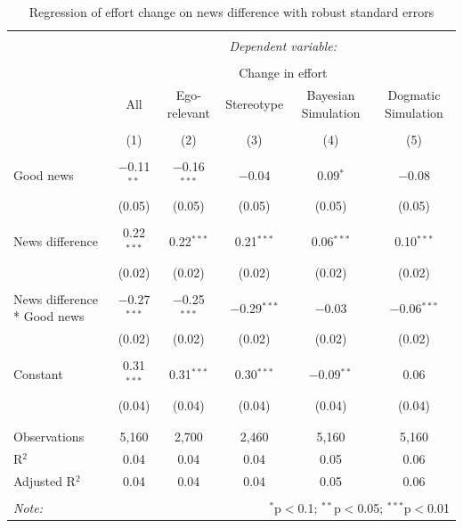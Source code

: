 \documentclass[
  12pt,
]{article}
\begin{document}
\begin{table} \centering 
  \caption{Regression of effort change on news difference with robust standard errors} 
  \label{tab:regression} 
\begin{tabular}{@{\extracolsep{5pt}}lccccc} 
\\[-1.8ex]\hline 
\hline \\[-1.8ex] 
 & \multicolumn{5}{c}{\textit{Dependent variable:}} \\ 
\cline{2-6} 
\\[-1.8ex] & \multicolumn{5}{c}{Change in effort} \\ 
 & All & Ego-relevant & Stereotype & Bayesian Simulation & Dogmatic Simulation \\ 
\\[-1.8ex] & (1) & (2) & (3) & (4) & (5)\\ 
\hline \\[-1.8ex] 
 Good news & $-$0.11$^{**}$ & $-$0.16$^{***}$ & $-$0.04 & 0.09$^{*}$ & $-$0.08 \\ 
  & (0.05) & (0.05) & (0.05) & (0.05) & (0.05) \\ 
  & & & & & \\ 
 News difference & 0.22$^{***}$ & 0.22$^{***}$ & 0.21$^{***}$ & 0.06$^{***}$ & 0.10$^{***}$ \\ 
  & (0.02) & (0.02) & (0.02) & (0.02) & (0.02) \\ 
  & & & & & \\ 
 News difference * Good news & $-$0.27$^{***}$ & $-$0.25$^{***}$ & $-$0.29$^{***}$ & $-$0.03 & $-$0.06$^{***}$ \\ 
  & (0.02) & (0.02) & (0.02) & (0.02) & (0.02) \\ 
  & & & & & \\ 
 Constant & 0.31$^{***}$ & 0.31$^{***}$ & 0.30$^{***}$ & $-$0.09$^{**}$ & 0.06 \\ 
  & (0.04) & (0.04) & (0.04) & (0.04) & (0.04) \\ 
  & & & & & \\ 
\hline \\[-1.8ex] 
Observations & 5,160 & 2,700 & 2,460 & 5,160 & 5,160 \\ 
R$^{2}$ & 0.04 & 0.04 & 0.04 & 0.05 & 0.06 \\ 
Adjusted R$^{2}$ & 0.04 & 0.04 & 0.04 & 0.05 & 0.06 \\ 
\hline 
\hline \\[-1.8ex] 
\textit{Note:}  & \multicolumn{5}{r}{$^{*}$p$<$0.1; $^{**}$p$<$0.05; $^{***}$p$<$0.01} \\ 
\end{tabular} 
\end{table}
\end{document}
